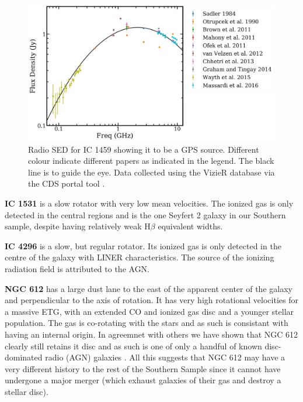 \begin{figure}
	\centering
	\includegraphics[height=0.4\textwidth]{appendix/appendix2/ic1459.png}
	\caption[Radio SED for IC 1459]{Radio SED for IC 1459 showing it to be a GPS source. Different colour indicate different papers as indicated in the legend. The black line is to guide the eye. Data collected using the VizieR database via the CDS portal tool \citep{Ochsenbein2000}.} 
	\label{fig:ic1459radio}
\end{figure}
\nocite{Brown2011, Massardi2016, Ofek2011, Wayth2015, Mahony2011, Otrupcek1990, Graham2014, Chhetri2013, VanVelzen2012, Sadler1984}

\textbf{IC 1531} is a slow rotator with very low mean velocities. The ionized gas is only detected in the central regions and is the one Seyfert 2 galaxy in our Southern sample, despite having relatively weak H$\beta$ equivalent widths. 

\textbf{IC 4296} is a slow, but regular rotator. Its ionized gas is only detected in the centre of the galaxy with LINER characteristics. The source of the ionizing radiation field is attributed to the AGN. 

\textbf{NGC 612} has a large dust lane to the east of the apparent center of the galaxy and perpendicular to the axis of rotation. It has very high rotational velocities for a massive ETG, with an extended CO and ionized gas disc and a younger stellar population. The gas is co-rotating with the stars and as such is consistant with having an internal origin. In agreemnet with others \citep[e.g.][]{Ledlow1998, Emonts2009} we have shown that NGC 612 clearly still retains it disc and as such is one of only a handful of known disc-dominated radio (AGN) galaxies \citep[e.g.][]{Heckman1982, Ledlow1998, Morganti2011, Mao2015}. All this suggests that NGC 612 may have a very different history to the rest of the Southern Sample since it cannot have undergone a major merger (which exhaust galaxies of their gas and destroy a stellar disc).

